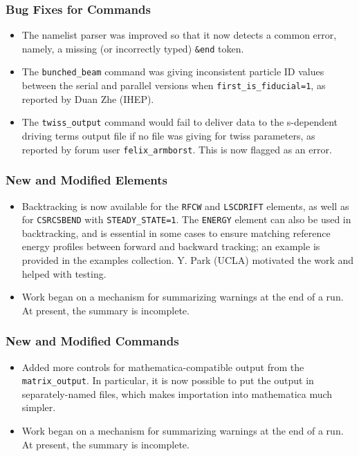 \documentclass[11pt]{article}
\begin{document}
\subsubsection{Bug Fixes for Commands}
\begin{itemize}
\item The namelist parser was improved so that it now detects a common error, namely, a missing (or incorrectly typed)
  \verb|&end| token.
\item The \verb|bunched_beam| command was giving inconsistent particle ID values between the serial and parallel versions
  when \verb|first_is_fiducial=1|, as reported by Duan Zhe (IHEP).
\item The \verb|twiss_output| command would fail to deliver data to the s-dependent driving terms output file if
  no file was giving for twiss parameters, as reported by forum user \verb|felix_armborst|. This is now flagged as an 
  error.
\end{itemize}

\subsubsection{New and Modified Elements}
\begin{itemize}
\item Backtracking is now available for the \verb|RFCW| and \verb|LSCDRIFT| elements, as well as for \verb|CSRCSBEND| with
  \verb|STEADY_STATE=1|. The \verb|ENERGY| element can also be used in backtracking, and is essential in some cases to
  ensure matching reference energy profiles between forward and backward tracking; an example is provided in the
  examples collection.  Y. Park (UCLA) motivated the work and helped with testing.
\item Work began on a mechanism for summarizing warnings at the end of a run. At present, the summary is incomplete.
\end{itemize}

\subsubsection{New and Modified Commands}
\begin{itemize}
\item Added more controls for mathematica-compatible output from the \verb|matrix_output|. In particular, it is now possible to
  put the output in separately-named files, which makes importation into mathematica much simpler.
\item Work began on a mechanism for summarizing warnings at the end of a run. At present, the summary is incomplete.
\end{itemize}
\end{document}
